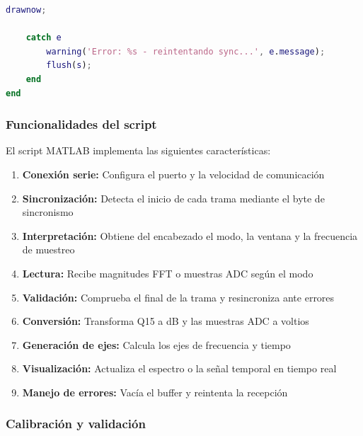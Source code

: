 \documentclass[12pt]{article}
\begin{document}
				\begin{lstlisting}[style=pythonstyle, language=Matlab, caption=Actualización de las gráficas y manejo de errores]
        drawnow;

    catch e
        warning('Error: %s - reintentando sync...', e.message);
        flush(s);
    end
end
				\end{lstlisting}

			\subsubsection{Funcionalidades del script}

				El script MATLAB implementa las siguientes características:

				\begin{enumerate}
					\item \textbf{Conexión serie:} Configura el puerto y la velocidad de comunicación
					
					\item \textbf{Sincronización:} Detecta el inicio de cada trama mediante el byte de sincronismo
					
					\item \textbf{Interpretación:} Obtiene del encabezado el modo, la ventana y la frecuencia de muestreo
					
					\item \textbf{Lectura:} Recibe magnitudes FFT o muestras ADC según el modo
					
					\item \textbf{Validación:} Comprueba el final de la trama y resincroniza ante errores
					
					\item \textbf{Conversión:} Transforma Q15 a dB y las muestras ADC a voltios
					
					\item \textbf{Generación de ejes:} Calcula los ejes de frecuencia y tiempo

					\item \textbf{Visualización:} Actualiza el espectro o la señal temporal en tiempo real

					\item \textbf{Manejo de errores:} Vacía el buffer y reintenta la recepción
				\end{enumerate}

			\subsubsection{Calibración y validación}
\end{document}

